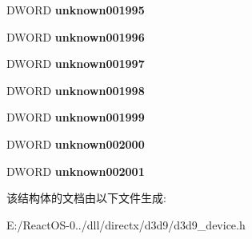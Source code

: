 \begin{DoxyCompactItemize}
\mbox{\label{struct___direct3_d_device9___i_n_t_a4b2d2155acbb7bc613580db6a3d1e16a}} 
D\+W\+O\+RD {\bfseries unknown001995}
\item 
\mbox{\label{struct___direct3_d_device9___i_n_t_a825f896c302ed27d342b8cb5e21585e9}} 
D\+W\+O\+RD {\bfseries unknown001996}
\item 
\mbox{\label{struct___direct3_d_device9___i_n_t_a1d8c5756fa6f83eada3de32f48e0c54f}} 
D\+W\+O\+RD {\bfseries unknown001997}
\item 
\mbox{\label{struct___direct3_d_device9___i_n_t_ae6871689d9d82860bae6de0b7c441b48}} 
D\+W\+O\+RD {\bfseries unknown001998}
\item 
\mbox{\label{struct___direct3_d_device9___i_n_t_a080a9360425c215bcf8e947ef7a043b9}} 
D\+W\+O\+RD {\bfseries unknown001999}
\item 
\mbox{\label{struct___direct3_d_device9___i_n_t_a107f61fce5df47882c31faf40079cb91}} 
D\+W\+O\+RD {\bfseries unknown002000}
\item 
\mbox{\label{struct___direct3_d_device9___i_n_t_a4a7c5e362c4230a7644e9f34269cefaf}} 
D\+W\+O\+RD {\bfseries unknown002001}
\end{DoxyCompactItemize}


该结构体的文档由以下文件生成\+:\begin{DoxyCompactItemize}
\item 
E\+:/\+React\+O\+S-\/0../dll/directx/d3d9/d3d9\+\_\+device.\+h\end{DoxyCompactItemize}
